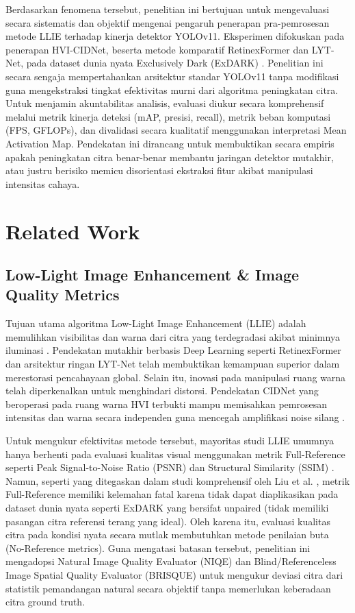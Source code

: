 \documentclass[conference]{IEEEtran}
\begin{document}
Berdasarkan fenomena tersebut, penelitian ini bertujuan untuk mengevaluasi secara sistematis dan objektif mengenai pengaruh penerapan pra-pemrosesan metode LLIE terhadap kinerja detektor YOLOv11. Eksperimen difokuskan pada penerapan HVI-CIDNet, beserta metode komparatif RetinexFormer dan LYT-Net, pada dataset dunia nyata Exclusively Dark (ExDARK) \cite{loh2019exdark}. Penelitian ini secara sengaja mempertahankan arsitektur standar YOLOv11 tanpa modifikasi guna mengekstraksi tingkat efektivitas murni dari algoritma peningkatan citra. Untuk menjamin akuntabilitas analisis, evaluasi diukur secara komprehensif melalui metrik kinerja deteksi (mAP, presisi, recall), metrik beban komputasi (FPS, GFLOPs), dan divalidasi secara kualitatif menggunakan interpretasi Mean Activation Map. Pendekatan ini dirancang untuk membuktikan secara empiris apakah peningkatan citra benar-benar membantu jaringan detektor mutakhir, atau justru berisiko memicu disorientasi ekstraksi fitur akibat manipulasi intensitas cahaya.

\section{Related Work}
\subsection{Low-Light Image Enhancement \& Image Quality Metrics}
Tujuan utama algoritma Low-Light Image Enhancement (LLIE) adalah memulihkan visibilitas dan warna dari citra yang terdegradasi akibat minimnya iluminasi \cite{liu2021benchmark}. Pendekatan mutakhir berbasis Deep Learning seperti RetinexFormer \cite{cai2023retinexformer} dan arsitektur ringan LYT-Net \cite{brateanu2025lytnet} telah membuktikan kemampuan superior dalam merestorasi pencahayaan global. Selain itu, inovasi pada manipulasi ruang warna telah diperkenalkan untuk menghindari distorsi. Pendekatan CIDNet yang beroperasi pada ruang warna HVI terbukti mampu memisahkan pemrosesan intensitas dan warna secara independen guna mencegah amplifikasi noise silang \cite{yan2025hvi}. 

Untuk mengukur efektivitas metode tersebut, mayoritas studi LLIE umumnya hanya berhenti pada evaluasi kualitas visual menggunakan metrik Full-Reference seperti Peak Signal-to-Noise Ratio (PSNR) dan Structural Similarity (SSIM) \cite{wu2024llieeffect}. Namun, seperti yang ditegaskan dalam studi komprehensif oleh Liu et al. \cite{liu2021benchmark}, metrik Full-Reference memiliki kelemahan fatal karena tidak dapat diaplikasikan pada dataset dunia nyata seperti ExDARK yang bersifat unpaired (tidak memiliki pasangan citra referensi terang yang ideal). Oleh karena itu, evaluasi kualitas citra pada kondisi nyata secara mutlak membutuhkan metode penilaian buta (No-Reference metrics). Guna mengatasi batasan tersebut, penelitian ini mengadopsi Natural Image Quality Evaluator (NIQE) \cite{mittal2013niqe} dan Blind/Referenceless Image Spatial Quality Evaluator (BRISQUE) \cite{mittal2012brisque} untuk mengukur deviasi citra dari statistik pemandangan natural secara objektif tanpa memerlukan keberadaan citra ground truth.
\end{document}
